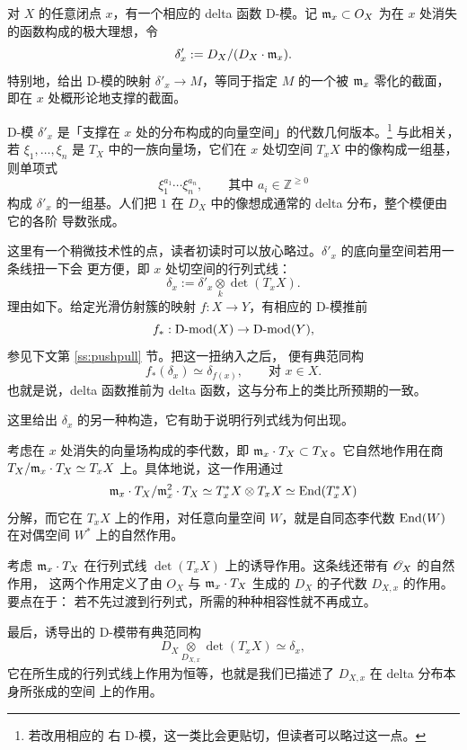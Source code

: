 \begin{ex} 对 $X$ 的任意闭点 $x$，有一个相应的 delta 函数 D-模。记 $\mathfrak{m}_x\subset O_X$ 为在 $x$
处消失的函数构成的极大理想，令
\[
\delta'_x:=D_X/(D_X\cdot\mathfrak{m}_x).
\]
特别地，给出 D-模的映射 $\delta'_x\to M$，等同于指定 $M$ 的一个被 $\mathfrak{m}_x$ 零化的截面，
即在 $x$ 处概形论地支撑的截面。

D-模 $\delta'_x$ 是「支撑在 $x$ 处的分布构成的向量空间」的代数几何版本。\footnote{若改用相应的
右 D-模，这一类比会更贴切，但读者可以略过这一点。} 与此相关，若 $\xi_1,\ldots,\xi_n$ 是
$T_X$ 中的一族向量场，它们在 $x$ 处切空间 $T_xX$ 中的像构成一组基，则单项式
\begin{equation} \label{PBW}
\xi_1^{a_1}\cdots\xi_n^{a_n},\qquad\text{其中 } a_i\in\mathbb{Z}^{\geqslant 0}
\end{equation}
构成 $\delta'_x$ 的一组基。人们把 $1$ 在 $D_X$ 中的像想成通常的 delta 分布，整个模便由它的各阶
导数张成。

这里有一个稍微技术性的点，读者初读时可以放心略过。$\delta'_x$ 的底向量空间若用一条线扭一下会
更方便，即 $x$ 处切空间的行列式线：
\[
\delta_x:=\delta'_x\underset{k}{\otimes}\det(T_xX).
\]
理由如下。给定光滑仿射簇的映射 $f:X\to Y$，有相应的 D-模推前
$$f_*:\operatorname{D-mod}(X)\to\operatorname{D-mod}(Y),$$ 参见下文第 \ref{ss:pushpull} 节。把这一扭纳入之后，
便有典范同构
\[
f_*(\delta_x)\simeq\delta_{f(x)},\qquad\text{对 } x\in X.
\]
也就是说，delta 函数推前为 delta 函数，这与分布上的类比所预期的一致。
\end{ex}

\begin{re} \label{r:hwdelta} 这里给出 $\delta_x$ 的另一种构造，它有助于说明行列式线为何出现。

考虑在 $x$ 处消失的向量场构成的李代数，即 $\mathfrak{m}_x\cdot T_X\subset T_X$。它自然地作用在商
$T_X/\mathfrak{m}_x\cdot T_X\simeq T_xX$ 上。具体地说，这一作用通过
\[
\mathfrak{m}_x\cdot T_X/\mathfrak{m}_x^2\cdot T_X\simeq T^*_xX\otimes T_xX\simeq\operatorname{End}(T^*_xX)
\]
分解，而它在 $T_xX$ 上的作用，对任意向量空间 $W$，就是自同态李代数 $\operatorname{End}(W)$ 在对偶空间
$W^*$ 上的自然作用。

考虑 $\mathfrak{m}_x\cdot T_X$ 在行列式线 $\det(T_xX)$ 上的诱导作用。这条线还带有 $\mathscr{O}_X$ 的自然作用，
这两个作用定义了由 $O_X$ 与 $\mathfrak{m}_x\cdot T_X$ 生成的 $D_X$ 的子代数 $D_{X,x}$ 的作用。要点在于：
若不先过渡到行列式，所需的种种相容性就不再成立。

最后，诱导出的 D-模带有典范同构
\[
D_X\underset{D_{X,x}}{\otimes}\det(T_xX)\simeq\delta_x,
\]
它在所生成的行列式线上作用为恒等，也就是我们已描述了 $D_{X,x}$ 在 delta 分布本身所张成的空间
上的作用。
\end{re}

